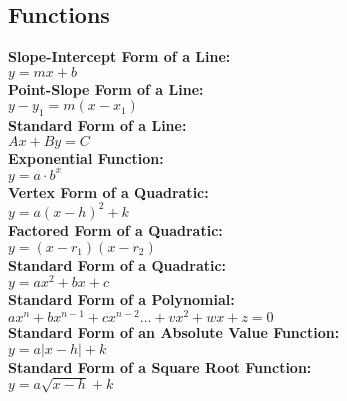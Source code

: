 \documentclass[12pt]{article}
\begin{document}
\subsection*{Functions}
\textbf{Slope-Intercept Form of a Line:}
    \\ \( y = mx + b \)
\\ \textbf{Point-Slope Form of a Line:}
    \\ \( y - y_1 = m( x - x_1 ) \)
\\ \textbf{Standard Form of a Line:}
    \\ \( Ax + By = C \)
\\ \textbf{Exponential Function:}
    \\ \( y = a \cdot b^x \)
\\ \textbf{Vertex Form of a Quadratic:}
    \\ \( y=  a( x - h )^2 + k \)
\\ \textbf{Factored Form of a Quadratic:}
    \\ \( y = ( x - r_1 ) ( x - r_2 ) \)
\\ \textbf{Standard Form of a Quadratic:}
    \\ \( y = ax^2 +bx + c \)
\\ \textbf{Standard Form of a Polynomial:}
    \\ \( ax^n + bx^{n-1} + cx^{n-2}... + vx^2 + wx + z = 0 \)
\\ \textbf{Standard Form of an Absolute Value Function:}
    \\ \( y = a| x - h | + k \)
\\ \textbf{Standard Form of a Square Root Function:}
    \\ \( y = a \sqrt{ x - h } + k \)
\end{document}

